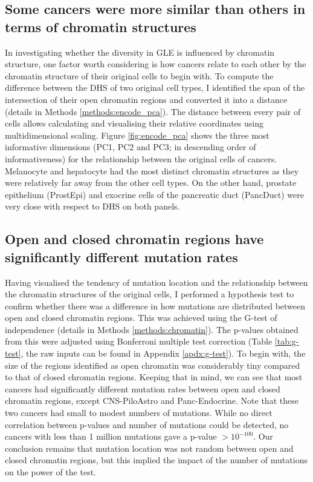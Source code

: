 

\subsection{Some cancers were more similar than others in terms of chromatin structures}\label{gle:pca}
In investigating whether the diversity in GLE is influenced by chromatin structure, one factor worth considering is how cancers relate to each other by the chromatin structure of their original cells to begin with. To compute the difference between the DHS of two original cell types, I identified the span of the intersection of their open chromatin regions and converted it into a distance (details in Methods \ref{methods:encode_pca}). The distance between every pair of cells allows calculating and visualising their relative coordinates using multidimensional scaling. Figure \ref{fig:encode_pca} shows the three most informative dimensions (PC1, PC2 and PC3; in descending order of informativeness) for the relationship between the original cells of cancers. Melanocyte and hepatocyte had the most distinct chromatin structures as they were relatively far away from the other cell types. On the other hand, prostate epithelium (ProstEpi) and exocrine cells of the pancreatic duct (PancDuct) were very close with respect to DHS on both panels.



\subsection{Open and closed chromatin regions have significantly different mutation rates}\label{gle:g}
Having visualised the tendency of mutation location and the relationship between the chromatin structures of the original cells, I performed a hypothesis test to confirm whether there was a difference in how mutations are distributed between open and closed chromatin regions. This was achieved using the G-test of independence (details in Methods \ref{methods:chromatin}). The p-values obtained from this were adjusted using Bonferroni multiple test correction (Table \ref{tab:g-test}, the raw inputs can be found in Appendix \ref{apdx:g-test}). To begin with, the size of the regions identified as open chromatin was considerably tiny compared to that of closed chromatin regions. Keeping that in mind, we can see that most cancers had significantly different mutation rates between open and closed chromatin regions, except CNS-PiloAstro and Panc-Endocrine. Note that these two cancers had small to modest numbers of mutations. While no direct correlation between p-values and number of mutations could be detected, no cancers with less than 1 million mutations gave a p-value $>10^{-100}$. Our conclusion remains that mutation location was not random between open and closed chromatin regions, but this implied the impact of the number of mutations on the power of the test. 

